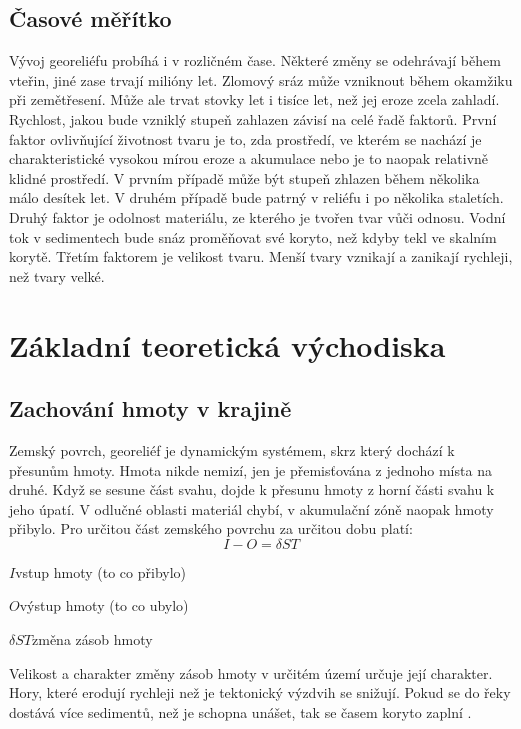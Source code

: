 \subsection{Časové měřítko}
Vývoj georeliéfu probíhá i v rozličném čase. Některé změny se odehrávají během vteřin, jiné zase trvají milióny let. Zlomový sráz může vzniknout během okamžiku při zemětřesení. Může ale trvat stovky let i tisíce let, než jej eroze zcela zahladí. Rychlost, jakou bude vzniklý stupeň zahlazen závisí na celé řadě faktorů. První faktor ovlivňující životnost tvaru je to, zda prostředí, ve kterém se nachází je charakteristické vysokou mírou eroze a akumulace nebo je to naopak relativně klidné prostředí. V prvním případě může být stupeň zhlazen během několika málo desítek let. V druhém případě bude patrný v reliéfu i po několika staletích. Druhý faktor je odolnost materiálu, ze kterého je tvořen tvar vůči odnosu. Vodní tok v sedimentech bude snáz proměňovat své koryto, než kdyby tekl ve skalním korytě. Třetím faktorem je velikost tvaru. Menší tvary vznikají a zanikají rychleji, než tvary velké. 

\section{Základní teoretická východiska}

\subsection{Zachování hmoty v krajině}
Zemský povrch, georeliéf je dynamickým systémem, skrz který dochází k přesunům hmoty. Hmota nikde nemizí, jen je přemisťována z jednoho místa na druhé. Když se sesune část svahu, dojde k přesunu hmoty z horní části svahu k jeho úpatí. V odlučné oblasti materiál chybí, v akumulační zóně naopak hmoty přibylo. Pro určitou část zemského povrchu za určitou dobu platí: 
\begin{equation}\label{key}
	I-O=\delta ST	
\end{equation}
\begin{eqexpl}
	\item{$I$}vstup hmoty (to co přibylo)
	\item{$O$}výstup hmoty (to co ubylo)
	\item{$\delta ST$}změna zásob hmoty
\end{eqexpl}

Velikost a charakter změny zásob hmoty v určitém území určuje její charakter. Hory, které erodují rychleji než je tektonický výzdvih se snižují. Pokud se do řeky dostává více sedimentů, než je schopna unášet, tak se časem koryto zaplní \parencite{biermanKeyConceptsGeomorphology2014}.

